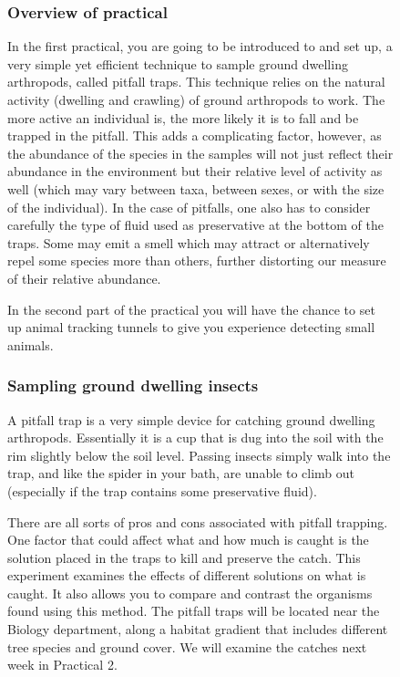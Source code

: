 \documentclass[
  letterpaper,
  DIV=11,
  numbers=noendperiod]{scrreprt}
\begin{document}
\begin{figure}
{\subsubsection{Overview of practical}\label{overview-of-practical-1}

In the first practical, you are going to be introduced to and set up, a
very simple yet efficient technique to sample ground dwelling
arthropods, called pitfall traps. This technique relies on the natural
activity (dwelling and crawling) of ground arthropods to work. The more
active an individual is, the more likely it is to fall and be trapped in
the pitfall. This adds a complicating factor, however, as the abundance
of the species in the samples will not just reflect their abundance in
the environment but their relative level of activity as well (which may
vary between taxa, between sexes, or with the size of the individual).
In the case of pitfalls, one also has to consider carefully the type of
fluid used as preservative at the bottom of the traps. Some may emit a
smell which may attract or alternatively repel some species more than
others, further distorting our measure of their relative abundance.

In the second part of the practical you will have the chance to set up
animal tracking tunnels to give you experience detecting small animals.

\subsubsection{Sampling ground dwelling
insects}\label{sampling-ground-dwelling-insects}

A pitfall trap is a very simple device for catching ground dwelling
arthropods. Essentially it is a cup that is dug into the soil with the
rim slightly below the soil level. Passing insects simply walk into the
trap, and like the spider in your bath, are unable to climb out
(especially if the trap contains some preservative fluid).

There are all sorts of pros and cons associated with pitfall trapping.
One factor that could affect what and how much is caught is the solution
placed in the traps to kill and preserve the catch. This experiment
examines the effects of different solutions on what is caught. It also
allows you to compare and contrast the organisms found using this
method. The pitfall traps will be located near the Biology department,
along a habitat gradient that includes different tree species and ground
cover. We will examine the catches next week in Practical 2.

}
\end{figure}
\end{document}
